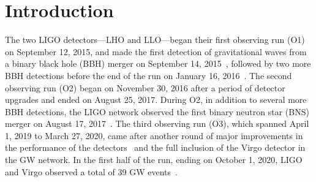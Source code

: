 \section{Introduction}

The two \ac{LIGO} detectors---\ac{LHO} and \ac{LLO}---began their first observing run (O1) on September 12, 2015, and made the first detection of gravitational waves from a binary black hole (BBH) merger on September 14, 2015~\cite{gw150914}, followed by two more BBH detections before the end of the run on January 16, 2016~\cite{gwtc1}.
The second observing run (O2) began on November 30, 2016 after a period of detector upgrades and ended on August 25, 2017.
During O2, in addition to several more BBH detections, the \ac{LIGO} network observed the first binary neutron star (BNS) merger on August 17, 2017~\cite{gw170817}.
The third observing run (O3), which spanned April 1, 2019 to March 27, 2020, came after another round of major improvements in the performance of the detectors~\cite{Buikema_2020} and the full inclusion of the Virgo detector in the GW network.
In the first half of the run, ending on October 1, 2020, \ac{LIGO} and Virgo observed a total of 39 GW events~\cite{gwtc2}.
